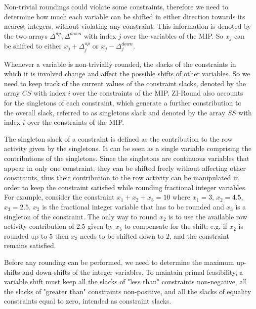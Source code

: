 \documentclass[a4paper,12pt]{book}
\begin{document}
Non-trivial roundings could violate some constraints, therefore we need to determine how much each variable can be shifted in either direction towards its nearest integers, without violating any constraint. This information is denoted by the two arrays $\Delta^{up}, \Delta^{down}$ with index $j$ over the variables of the MIP. So $x_j$ can be shifted to either $x_j + \Delta_{j}^{up}$ or $x_j - \Delta_{j}^{down}$. \par

Whenever a variable is non-trivially rounded, the slacks of the constraints in which it is involved change and affect the possible shifts of other variables. So we need to keep track of the current values of the constraint slacks, denoted by the array $CS$ with index $i$ over the constraints of the MIP.
ZI-Round also accounts for the singletons of each constraint, which generate a further constribution to the overall slack, referred to as singletons slack and denoted by the array $SS$ with index $i$ over the constraints of the MIP. \par 

The singleton slack of a constraint is defined as the contribution to the row activity given by the singletons. It can be seen as a single variable comprising the contributions of the singletons. 
Since the singletons are continuous variables that appear in only one constraint, they can be shifted freely without affecting other constraints, thus their contribution to the row activity can be manipulated in order to keep the constraint satisfied while rounding fractional integer variables. For example, consider the constraint $x_1 + x_2 + x_3 = 10$ where $x_1 = 3$, $x_2 = 4.5$, $x_3 = 2.5$, $x_2$ is the fractional integer variable that has to be rounded and $x_3$ is a singleton of the constraint. The only way to round $x_2$ is to use the available row activity contribution of $2.5$ given by $x_3$ to compensate for the shift: e.g. if $x_2$ is rounded up to $5$ then $x_3$ needs to be shifted down to $2$, and the constraint remains satisfied. \par 

Before any rounding can be performed, we need to determine the maximum up-shifts and down-shifts of the integer variables. To maintain primal feasibility, a variable shift must keep all the slacks of "less than" constraints non-negative, all the slacks of "greater than" constraints non-positive, and all the slacks of equality constraints equal to zero, intended as constraint slacks. \par
\end{document}
